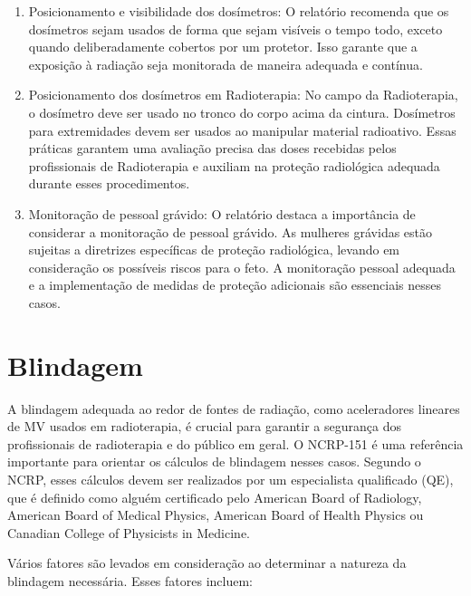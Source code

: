 \documentclass[11pt,a4paper]{article}
\begin{document}
\begin{enumerate}
		\item Posicionamento e visibilidade dos dosímetros: O relatório recomenda que os dosímetros sejam usados de forma que sejam visíveis o tempo todo, exceto quando deliberadamente cobertos por um protetor. Isso garante que a exposição à radiação seja monitorada de maneira adequada e contínua.
		
		\item Posicionamento dos dosímetros em Radioterapia: No campo da Radioterapia, o dosímetro deve ser usado no tronco do corpo acima da cintura. Dosímetros para extremidades devem ser usados ao manipular material radioativo. Essas práticas garantem uma avaliação precisa das doses recebidas pelos profissionais de Radioterapia e auxiliam na proteção radiológica adequada durante esses procedimentos.
		
		\item Monitoração de pessoal grávido: O relatório destaca a importância de considerar a monitoração de pessoal grávido. As mulheres grávidas estão sujeitas a diretrizes específicas de proteção radiológica, levando em consideração os possíveis riscos para o feto. A monitoração pessoal adequada e a implementação de medidas de proteção adicionais são essenciais nesses casos.
	\end{enumerate}



\section{Blindagem}

	A blindagem adequada ao redor de fontes de radiação, como aceleradores lineares de MV usados em radioterapia, é crucial para garantir a segurança dos profissionais de radioterapia e do público em geral. O NCRP-151 é uma referência importante para orientar os cálculos de blindagem nesses casos. Segundo o NCRP, esses cálculos devem ser realizados por um especialista qualificado (QE), que é definido como alguém certificado pelo American Board of Radiology, American Board of Medical Physics, American Board of Health Physics ou Canadian College of Physicists in Medicine.

	Vários fatores são levados em consideração ao determinar a natureza da blindagem necessária. Esses fatores incluem:
\end{document}
